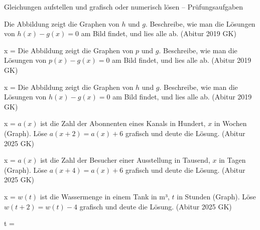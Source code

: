 \begin{aufgabe}{Gleichungen aufstellen und grafisch oder numerisch lösen – Prüfungsaufgaben}
\begin{teile}
\teil Die Abbildung zeigt die Graphen von $h$ und $g$. Beschreibe, wie man die Lösungen von $h(x) - g(x) = 0$ am Bild findet, und lies alle ab. \hfill (Abitur 2019 GK) \\

\begin{ksys}[xmin=-4,xmax=4,ymin=-4,ymax=4,ablesen]   \end{ksys}
x = \leerfeld
\teil Die Abbildung zeigt die Graphen von $p$ und $g$. Beschreibe, wie man die Lösungen von $p(x) - g(x) = 0$ am Bild findet, und lies alle ab. \hfill (Abitur 2019 GK) \\

\begin{ksys}[xmin=-2,xmax=5,ymin=-4,ymax=4,ablesen]   \end{ksys}
x = \leerfeld
\teil Die Abbildung zeigt die Graphen von $h$ und $g$. Beschreibe, wie man die Lösungen von $h(x) - g(x) = 0$ am Bild findet, und lies alle ab. \hfill (Abitur 2019 GK) \\

\begin{ksys}[xmin=-4,xmax=4,ymin=-4,ymax=4,ablesen]   \end{ksys}
x = \leerfeld
\teil $a(x)$ ist die Zahl der Abonnenten eines Kanals in Hundert, $x$ in Wochen (Graph). Löse $a(x + 2) = a(x) + 6$ grafisch und deute die Lösung. \hfill (Abitur 2025 GK) \\

\begin{ksys}[xmin=0,xmax=6,ymin=0,ymax=10,ablesen]  \end{ksys}
x = \leerfeld
\teil $a(x)$ ist die Zahl der Besucher einer Ausstellung in Tausend, $x$ in Tagen (Graph). Löse $a(x + 4) = a(x) + 6$ grafisch und deute die Lösung. \hfill (Abitur 2025 GK) \\

\begin{ksys}[xmin=0,xmax=6,ymin=0,ymax=8,ablesen]  \end{ksys}
x = \leerfeld
\teil $w(t)$ ist die Wassermenge in einem Tank in m³, $t$ in Stunden (Graph). Löse $w(t + 2) = w(t) - 4$ grafisch und deute die Lösung. \hfill (Abitur 2025 GK) \\

\begin{ksys}[xmin=0,xmax=7,ymin=0,ymax=18,ystep=2,ablesen]  \end{ksys}
t = \leerfeld
\end{teile}
\end{aufgabe}

